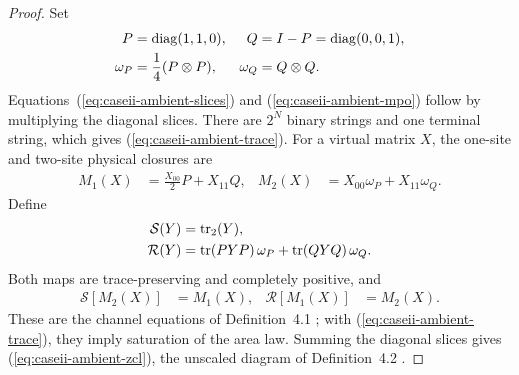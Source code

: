 \begin{proof}
    \leanok
    Set
    \begin{align}
        P        & =\operatorname{diag}(1,1,0),
                 & Q                            & =I-P=\operatorname{diag}(0,0,1),\notag                                    \\
        \omega_P & =\frac14(P\otimes P),
                 & \omega_Q                     & =Q\otimes Q.                                  \label{eq:caseii-pq-states}
    \end{align}
    Equations~(\ref{eq:caseii-ambient-slices}) and
    (\ref{eq:caseii-ambient-mpo}) follow by multiplying the diagonal slices.
    There are $2^N$ binary strings and one terminal string, which gives
    (\ref{eq:caseii-ambient-trace}). For a virtual matrix $X$, the one-site and
    two-site physical closures are
    \begin{align}
        M_1(X) & =\frac{X_{00}}2P+X_{11}Q,
               & M_2(X)                    & =X_{00}\omega_P+X_{11}\omega_Q.                 \label{eq:caseii-closures}
    \end{align}
    Define
    \begin{align}
        \mathcal S(Y) & =\operatorname{tr}_2(Y),\notag    \\
        \mathcal R(Y) & =\operatorname{tr}(PYP)\,\omega_P
        +\operatorname{tr}(QYQ)\,\omega_Q.                   \label{eq:caseii-channels}
    \end{align}
    Both maps are trace-preserving and completely positive, and
    \begin{align}
        \mathcal S[M_2(X)] & =M_1(X),
                           & \mathcal R[M_1(X)] & =M_2(X).                            \label{eq:caseii-channel-closures}
    \end{align}
    These are the channel equations of Definition~4.1
    \cite[lines~638--660]{Cirac2016MPDO_arXiv}; with
    (\ref{eq:caseii-ambient-trace}), they imply saturation of the area law. Summing
    the diagonal slices gives (\ref{eq:caseii-ambient-zcl}), the unscaled
    diagram of Definition~4.2
    \cite[lines~735--739]{Cirac2016MPDO_arXiv}.


\end{proof}
